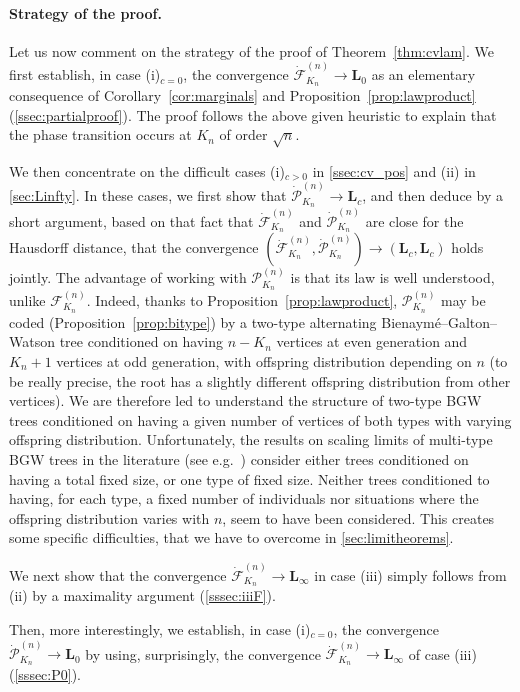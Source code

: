 \documentclass[AHL,XML,longabstracts,Unicode]{cedram}
\def\FKn{\mathcal{F}^{(n)}_{K_{n}}}
\def\PKn{\mathcal{P}^{(n)}_{K_{n}}}
\def\dFKn{\dot{\mathcal{F}}^{(n)}_{K_{n}}}
\def\dPKn{\dot{\mathcal{P}}^{(n)}_{K_{n}}}
\begin{document}
\paragraph*{Strategy of the proof.} Let us now comment on the strategy of the proof of  Theorem~\ref{thm:cvlam}. We first establish, in case (i)$_{c=0}$, the convergence $\dFKn \rightarrow \mathbf{L}_{0}$ as an elementary consequence of Corollary~\ref{cor:marginals} and Proposition~\ref{prop:lawproduct} (\cref{ssec:partialproof}). The proof follows the above given heuristic to explain that the phase transition occurs at $ K_{n}$ of order $\sqrt{n}$.

We then concentrate on the difficult cases  (i)$_{c>0}$ in \cref{ssec:cv_pos}
and (ii) in \cref{sec:Linfty}. In these cases, we first show that  $  \dPKn
\rightarrow \mathbf{L}_{c}$, and then deduce by a short argument, based on
that fact that $\dFKn$ and $\dPKn$ are close for the Hausdorff distance, that
the convergence $(\dFKn,\dPKn) \rightarrow (\mathbf{L}_{c},\mathbf{L}_{c})$
holds jointly.  The advantage of working with $\PKn$ is that its law is well
understood, unlike $\FKn$. Indeed, thanks to
Proposition~\ref{prop:lawproduct},  $\PKn$ may be coded
(Proposition~\ref{prop:bitype}) by a two-type  alternating
Bienaym\'e--Galton--Watson tree conditioned on having $n-K_{n}$ vertices at
even generation and $K_{n}+1$ vertices at odd generation, with offspring
distribution depending on $n$ (to be really precise, the root has a slightly
different offspring distribution from other vertices). We are therefore led
to understand the structure of two-type BGW trees conditioned on having a
given number of vertices of both types with varying offspring distribution.
Unfortunately, the results on scaling limits of multi-type BGW trees in the
literature (see e.g.\ \cite{MM07,Mie08b,Ber16}) consider either trees
conditioned on having a total fixed size, or one type of fixed size. Neither
trees conditioned to having, for each type, a fixed number of individuals nor
situations where the offspring distribution varies with $n$, seem to have
been considered. This creates some specific difficulties, that we have to
overcome in \cref{sec:limitheorems}.

We next show that the convergence $\dFKn \rightarrow \mathbf{L}_{\infty}$  in case (iii) simply follows from (ii) by a maximality argument (\cref{sssec:iiiF}).

Then,  more interestingly, we establish, in case (i)$_{c=0}$, the  convergence $\dPKn \rightarrow \mathbf{L}_{0}$ by using, surprisingly, the convergence $\dFKn \rightarrow \mathbf{L}_{\infty}$ of case (iii) (\cref{sssec:P0}).
\end{document}
